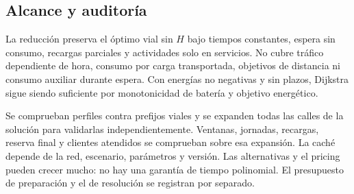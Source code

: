 \documentclass[11pt,a4paper]{article}
\begin{document}
\subsection{Alcance y auditoría}

La reducción preserva el óptimo vial sin $H$ bajo tiempos constantes, espera
sin consumo, recargas parciales y actividades solo en servicios. No cubre
tráfico dependiente de hora, consumo por carga transportada, objetivos de
distancia ni consumo auxiliar durante espera.
Con energías no negativas y sin plazos, Dijkstra sigue siendo suficiente por
monotonicidad de batería y objetivo energético.

Se comprueban perfiles contra prefijos viales y se expanden todas las calles
de la solución para validarlas independientemente. Ventanas, jornadas, recargas,
reserva final y clientes atendidos se comprueban sobre esa expansión.
La caché depende de la red, escenario, parámetros y versión. Las alternativas
y el pricing pueden crecer mucho: no hay una garantía de tiempo polinomial.
El presupuesto de preparación y el de resolución se registran por separado.
\end{document}
